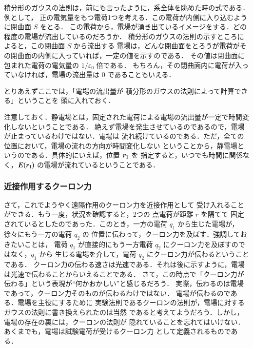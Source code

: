             積分形のガウスの法則は，前にも言ったように，系全体を眺めた時の式である．例として，
            正の電気量をもつ電荷1つを考える．この電荷が内側に入り込むように閉曲面 $S$ をとる．
            この電荷から，電場が湧き出ているイメージをする．どの程度の電場が流出しているのだろうか．
            積分形のガウスの法則の示すところによると，この閉曲面 $S$ から流出する
            電場は，どんな閉曲面をとろうが電荷がその閉曲面の内側に入っていれば，一定の値を示すのである．
            その値は閉曲面に包まれた電荷の電気量の $1/\varepsilon_{0}$ 倍である．
            もちろん，その閉曲面内に電荷が入っていなければ，電場の流出量は 0 であることもいえる．

            とりあえずここでは，「電場の流出量が 積分形のガウスの法則によって計算できる」ということを
            頭に入れておく．

            注意しておく．静電場とは，固定された電荷による電場の流出量が一定で時間変化しないということである．
            絶えず電場を発生させているのであるので，電場が止まっているわけではない．電場は
            流れ続けているのである．ただ，全ての位置において，電場の流れの方向が時間変化しない
            ということから，静電場というのである．具体的にいえば，位置 $\boldsymbol{r}_{1}$ を
            指定すると，いつでも時間に関係なく，$\boldsymbol{E}(\boldsymbol{r}_{1})$
            の電場が流れているということである．

        \subsubsection{近接作用するクーロン力}
            さて，これでようやく遠隔作用のクーロン力を近接作用として
            受け入れることができる．もう一度，状況を確認すると，2つの
            点電荷が距離 $r$ を隔てて
            固定されているとしたのであった．このとき，一方の電荷 $q_{1}$ から生じた電場が，
            徐々にもう一方の電荷 $q_{2}$ の
            位置に伝わって，クーロン力を及ぼす．強調しておきたいことは，
            電荷 $q_{1}$ が直接的にもう一方電荷 $q_{2}$ にクーロン力を及ぼすのではなく，$q_{1}$ から
            生じる電場を介して，電荷 $q_{2}$ にクーロン力が伝わるということである．
            クーロン力の伝わる速さは光速である．それは後に示すように，電場は光速で伝わることからいえることである．
            さて，この時点で「クーロン力が伝わる」という表現が“何かおかしい”と感じるだろう．
            実際，伝わるのは電場であって，クーロン力そのものが伝わるわけではない．
            電場が伝わるのである．電場を主役にするために
            実験法則であるクーロンの法則が，電場に対するガウスの法則に書き換えられたのは当然
            であると考えてようだろう．しかし，電場の存在の裏には，クーロンの法則が
            隠れていることを忘れてはいけない．あくまでも，電場は試験電荷が受けるクーロン力
            として定義されるものである．

